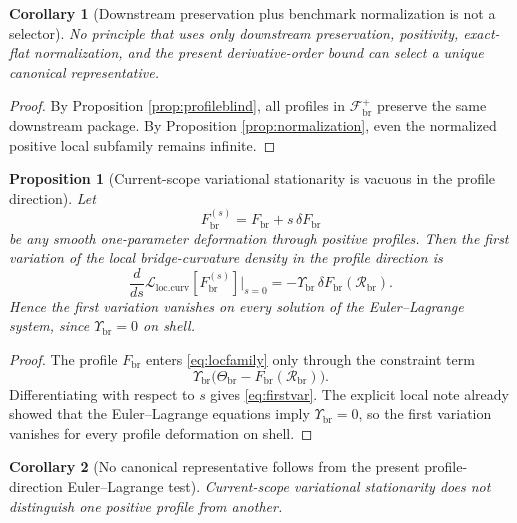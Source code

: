 \documentclass[11pt]{article}
\newcommand{\CurvSeed}{\Theta_{\mathrm{br}}}
\newcommand{\CurvSeedMult}{\Upsilon_{\mathrm{br}}}
\newcommand{\CurvProfile}{F_{\mathrm{br}}}
\newcommand{\BridgeCurv}{\mathcal R_{\mathrm{br}}}
\newcommand{\CurvFamily}{\mathscr F_{\mathrm{br}}^{+}}
\newtheorem{proposition}{Proposition}
\newtheorem{corollary}{Corollary}
\begin{document}
\begin{corollary}[Downstream preservation plus benchmark normalization is not a selector]
\label{cor:nobenchmark}
No principle that uses only downstream preservation, positivity, exact-flat normalization, and the present derivative-order bound can select a unique canonical representative.
\end{corollary}

\begin{proof}
By Proposition \ref{prop:profileblind}, all profiles in \(\CurvFamily\) preserve the same downstream package. By Proposition \ref{prop:normalization}, even the normalized positive local subfamily remains infinite.
\end{proof}

\begin{proposition}[Current-scope variational stationarity is vacuous in the profile direction]
\label{prop:vacuous}
Let
\begin{equation}
\CurvProfile^{(s)}=\CurvProfile+s\,\delta\CurvProfile
\label{eq:defdeform}
\end{equation}
be any smooth one-parameter deformation through positive profiles. Then the first variation of the local bridge-curvature density in the profile direction is
\begin{equation}
\frac{d}{ds}\mathcal L_{\mathrm{loc.curv}}[\CurvProfile^{(s)}]\bigg|_{s=0}
=
-\CurvSeedMult\,\delta\CurvProfile(\BridgeCurv).
\label{eq:firstvar}
\end{equation}
Hence the first variation vanishes on every solution of the Euler--Lagrange system, since \(\CurvSeedMult=0\) on shell.
\end{proposition}

\begin{proof}
The profile \(\CurvProfile\) enters \eqref{eq:locfamily} only through the constraint term
\[
\CurvSeedMult\bigl(\CurvSeed-\CurvProfile(\BridgeCurv)\bigr).
\]
Differentiating with respect to \(s\) gives \eqref{eq:firstvar}. The explicit local note already showed that the Euler--Lagrange equations imply \(\CurvSeedMult=0\), so the first variation vanishes for every profile deformation on shell.
\end{proof}

\begin{corollary}[No canonical representative follows from the present profile-direction Euler--Lagrange test]
\label{cor:novar}
Current-scope variational stationarity does not distinguish one positive profile from another.
\end{corollary}
\end{document}
